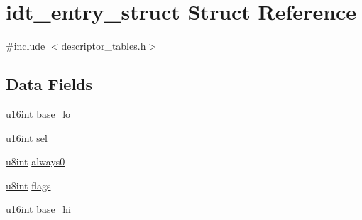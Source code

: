 \hypertarget{structidt__entry__struct}{
\section{idt\_\-entry\_\-struct Struct Reference}
\label{structidt__entry__struct}
}


{\ttfamily \#include $<$descriptor\_\-tables.h$>$}

\subsection*{Data Fields}
\begin{DoxyCompactItemize}
\item 
\hyperlink{library_8h_a863d9497073aad2b991aeab2211d87af}{u16int} \hyperlink{structidt__entry__struct_a87eb3dc5d98a750439e08c9e6703778b}{base\_\-lo}
\item 
\hyperlink{library_8h_a863d9497073aad2b991aeab2211d87af}{u16int} \hyperlink{structidt__entry__struct_adf6a7546c6355a8f87f34731860b49e1}{sel}
\item 
\hyperlink{library_8h_a1026e682ffdadc1701c42cd44ce9efcf}{u8int} \hyperlink{structidt__entry__struct_a9d3c870e7b1697c835095c536ac5b09b}{always0}
\item 
\hyperlink{library_8h_a1026e682ffdadc1701c42cd44ce9efcf}{u8int} \hyperlink{structidt__entry__struct_a138dda98fcd4738346af61bcca8cf4b4}{flags}
\item 
\hyperlink{library_8h_a863d9497073aad2b991aeab2211d87af}{u16int} \hyperlink{structidt__entry__struct_a65b35eebe0d81928a3ac5ddb1efe0fc3}{base\_\-hi}
\end{DoxyCompactItemize}


